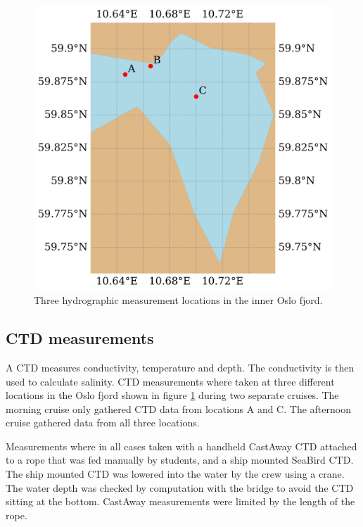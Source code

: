 \documentclass[a4paper,10pt,english]{article}
\begin{document}
\setlength{\intextsep}{-30pt}
\begin{figure}  %
        \centering
        \includegraphics[width=\linewidth]{../figures/station_map_3_stations.png}
        \caption{Three hydrographic measurement locations in the inner Oslo fjord.}
        \label{fig:map_ctd}
\end{figure}
\newpage
\subsection{CTD measurements}
A CTD measures conductivity, temperature and depth. The conductivity is then used to calculate salinity. CTD measurements where taken at three different locations in the Oslo fjord shown in figure \ref*{fig:map_ctd} during two separate cruises. The morning cruise only gathered CTD data from locations A and C. The afternoon cruise gathered data from all three locations. 

Measurements where in all cases taken with a handheld CastAway CTD attached to a rope that was fed manually by students, and a ship mounted SeaBird CTD. The ship mounted CTD was lowered into the water by the crew using a crane. The water depth was checked by computation with the bridge to avoid the CTD sitting at the bottom. CastAway measurements were limited by the length of the rope.
\end{document}
